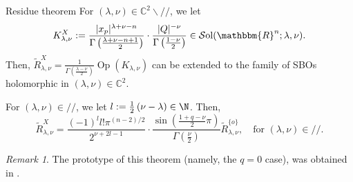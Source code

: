 \documentclass[pdf]{beamer}
\renewcommand{\setminus}{\backslash}
\newcommand{\tmop}[1]{\ensuremath{\operatorname{#1}}}
\newcommand{\assign}{:=}
\theoremstyle{mystyle}
\theoremstyle{remark}
\newtheorem{remark}{Remark}
\begin{document}
\begin{frame}{Residue theorem}
	For $(\lambda,\nu)\in\mathbb{C}^2\setminus//$, we let
\begin{equation*}
K_{\lambda, \nu}^X \assign \frac{| x_p |^{\lambda +
\nu - n}}{\Gamma \left( \frac{\lambda + \nu - n + 1}{2} \right)} \cdot \frac{|
Q |^{- \nu}}{\Gamma \left( \frac{1 - \nu}{2} \right)} \in \mathcal{S}
\mbox{ol} (\mathbbm{R}^n ; \lambda, \nu).
\end{equation*}
Then, $\tilde{R}_{\lambda, \nu}^X = \frac{1}{\Gamma \left( \frac{\lambda -
\nu}{2} \right)} \tmop{Op} (K_{\lambda, \nu})$ can be extended to the family of SBOs holomorphic in $(\lambda,\nu)\in\mathbb{C}^2$.
\begin{theorem}
	For $(\lambda,\nu)\in//$, we let $l:=\frac{1}{2}\left( \nu-\lambda \right)\in\N$. Then,
	\vspace{-1em}
\begin{equation*}
	\tilde{R}_{\lambda, \nu}^X = \frac{(- 1)^l l!
\pi^{(n - 2) / 2}}{2^{\nu + 2 l - 1}} \cdot \frac{\sin \left( \frac{1 + q -
\nu}{2} \pi \right)}{\Gamma \left( \frac{\nu}{2} \right)} \tilde{R}_{\lambda,
\nu}^{\{ o \}}, \quad \mbox{for }(\lambda, \nu) \in //.
\end{equation*}
\end{theorem}
\begin{remark}
		The prototype of this theorem (namely, the $q=0$ case), was obtained in
		\cite[Thm. 12.2]{kobayashi2015symmetry}.
\end{remark}
\end{frame}
\end{document}
